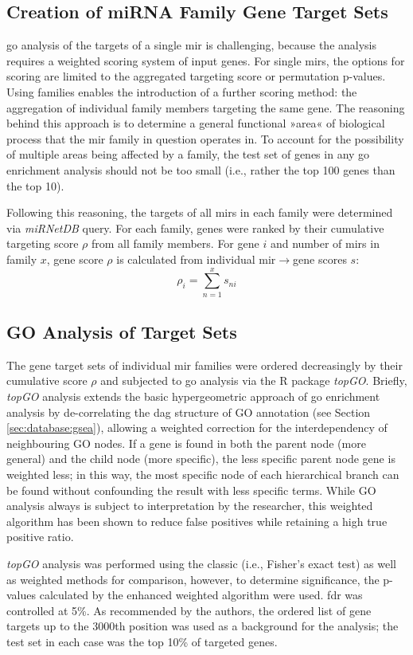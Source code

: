 \begin{method}

\subsection{Creation of miRNA Family Gene Target Sets}
\ac{go} analysis of the targets of a single \ac{mir} is challenging, because the analysis requires a weighted scoring system of input genes. For single \acp{mir}, the options for scoring are limited to the aggregated targeting score or permutation p-values. Using families enables the introduction of a further scoring method: the aggregation of individual family members targeting the same gene. The reasoning behind this approach is to determine a general functional »area« of biological process that the \ac{mir} family in question operates in. To account for the possibility of multiple areas being affected by a family, the test set of genes in any \ac{go} enrichment analysis should not be too small (i.e., rather the top 100 genes than the top 10). 

Following this reasoning, the targets of all \acp{mir} in each family were determined via \textit{miRNetDB} query. For each family, genes were ranked by their cumulative targeting score $\rho$ from all family members. For gene $i$ and number of \acp{mir} in family $x$, gene score $\rho$ is calculated from individual \ac{mir}$\to$gene scores $s$: $$\rho_{i} = \sum_{n=1}^{x} s_{ni}$$

\subsection{GO Analysis of Target Sets} \label{sec:cellculture:topgo}
The gene target sets of individual \ac{mir} families were ordered decreasingly by their cumulative score $\rho$ and subjected to \ac{go} analysis via the R package \textit{topGO}.\cite{Alexa2006} Briefly, \textit{topGO} analysis extends the basic hypergeometric approach of \ac{go} enrichment analysis by de-correlating the \ac{dag} structure of GO annotation (see Section \ref{sec:database:gsea}), allowing a weighted correction for the interdependency of neighbouring GO nodes. If a gene is found in both the parent node (more general) and the child node (more specific), the less specific parent node gene is weighted less; in this way, the most specific node of each hierarchical branch can be found without confounding the result with less specific terms. While GO analysis always is subject to interpretation by the researcher, this weighted algorithm has been shown to reduce false positives while retaining a high true positive ratio.

\textit{topGO} analysis was performed using the classic (i.e., Fisher's exact test) as well as weighted methods for comparison, however, to determine significance, the p-values calculated by the enhanced weighted algorithm were used. \ac{fdr} was controlled at 5\%. As recommended by the authors,\cite{Alexa2006} the ordered list of gene targets up to the 3000th position was used as a background for the analysis; the test set in each case was the top 10\% of targeted genes.

\end{method}

